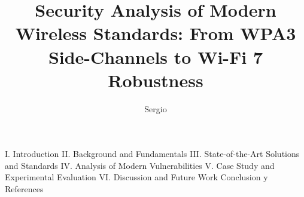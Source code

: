 \documentclass[journal]{IEEEtran}
\title{Security Analysis of Modern Wireless Standards: From WPA3 Side-Channels to Wi-Fi 7 Robustness
}
\author{Sergio}
\begin{document}
\maketitle
I. Introduction
II. Background and Fundamentals
III. State-of-the-Art Solutions and Standards
IV. Analysis of Modern Vulnerabilities
V. Case Study and Experimental Evaluation
VI. Discussion and Future Work
Conclusion y References
\end{document}
